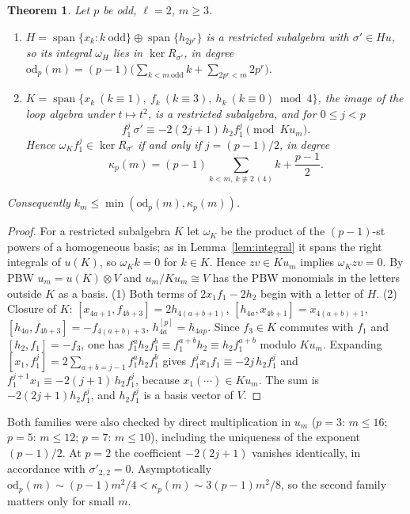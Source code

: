 \documentclass[11pt]{amsart}
\newtheorem{theorem}{Theorem}[section]
\theoremstyle{definition}
\begin{document}
\begin{theorem}\label{thm:famtwo}
Let $p$ be odd, $\ell=2$, $m\ge3$.
\begin{enumerate}
\item $H=\operatorname{span}\{x_k:k\ \text{odd}\}\oplus\operatorname{span}\{h_{2p^r}\}$ is a restricted subalgebra with
$\sigma'\in Hu$, so its integral $\omega_H$ lies in $\ker R_{\sigma'}$, in degree
$\mathrm{od}_p(m)=(p-1)\bigl(\sum_{k<m\ \mathrm{odd}}k+\sum_{2p^r<m}2p^r\bigr)$.
\item $K=\operatorname{span}\{x_k\ (k\equiv1),\ f_k\ (k\equiv3),\ h_k\ (k\equiv0)\bmod 4\}$, the image of the loop algebra under
$t\mapsto t^2$, is a restricted subalgebra, and for $0\le j<p$
\[
  f_1^j\,\sigma'\equiv-2(2j+1)\,h_2f_1^j\pmod{Ku_m}.
\]
Hence $\omega_Kf_1^j\in\ker R_{\sigma'}$ if and only if $j=(p-1)/2$, in degree
\[
  \kappa_p(m)=(p-1)\sum_{k<m,\ k\not\equiv2\ (4)}k+\frac{p-1}2 .
\]
\end{enumerate}
Consequently $k_m\le\min(\mathrm{od}_p(m),\kappa_p(m))$.
\end{theorem}

\begin{proof}
For a restricted subalgebra $K$ let $\omega_K$ be the product of the $(p-1)$-st powers of a homogeneous basis; as in
Lemma~\ref{lem:integral} it spans the right integrals of $u(K)$, so $\omega_Kk=0$ for $k\in K$. Hence $zv\in Ku_m$
implies $\omega_Kzv=0$. By PBW $u_m=u(K)\otimes V$ and $u_m/Ku_m\cong V$ has the PBW monomials in the letters outside $K$ as a basis. (1) Both terms
of $2x_1f_1-2h_2$ begin with a letter of $H$. (2) Closure of $K$: $[x_{4a+1},f_{4b+3}]=2h_{4(a+b+1)}$,
$[h_{4a},x_{4b+1}]=x_{4(a+b)+1}$, $[h_{4a},f_{4b+3}]=-f_{4(a+b)+3}$, $h_{4a}^{[p]}=h_{4ap}$. Since $f_3\in K$ commutes with
$f_1$ and $[h_2,f_1]=-f_3$, one has $f_1^ah_2f_1^b\equiv f_1^{a+b}h_2\equiv h_2f_1^{a+b}$ modulo $Ku_m$. Expanding
$[x_1,f_1^j]=2\sum_{a+b=j-1}f_1^ah_2f_1^b$ gives $f_1^jx_1f_1\equiv-2j\,h_2f_1^j$ and $f_1^{j+1}x_1\equiv-2(j+1)\,h_2f_1^j$,
because $x_1(\cdots)\in Ku_m$. The sum is $-2(2j+1)h_2f_1^j$, and $h_2f_1^j$ is a basis vector of $V$.
\end{proof}

Both families were also checked by direct multiplication in $u_m$ ($p=3$: $m\le16$; $p=5$: $m\le12$; $p=7$: $m\le10$),
including the uniqueness of the exponent $(p-1)/2$. At $p=2$ the coefficient $-2(2j+1)$ vanishes identically, in
accordance with $\sigma'_{2,2}=0$. Asymptotically $\mathrm{od}_p(m)\sim(p-1)m^2/4<\kappa_p(m)\sim3(p-1)m^2/8$, so the second
family matters only for small $m$.
\end{document}
